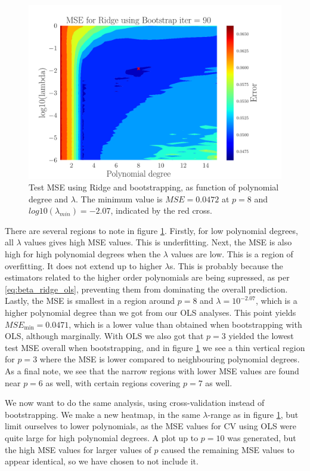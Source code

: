 \documentclass[reprint,english,notitlepage,aps,nobalancelastpage,nofootinbib]{revtex4-1}  %
\begin{document}
\begin{figure}[h]
	\begin{center}
		\includegraphics[width=0.8\linewidth]{Contour_PL_Ridge_Bootstrap90_n30_eps0.2_p1_15_lmb0_m6.pdf}
	\end{center}
	\caption{Test MSE using Ridge and bootstrapping, as function of polynomial degree and $\lambda$. The minimum value is $MSE=0.0472$ at $p=8$ and $log10(\lambda_{min}) = -2.07$, indicated by the red cross.}
	\label{fig:Ridge-boot_heatmap}
\end{figure}

There are several regions to note in figure \ref{fig:Ridge-boot_heatmap}. Firstly, for low polynomial degrees, all $\lambda$ values gives high MSE values. This is underfitting. Next, the MSE is also high for high polynomial degrees when the $\lambda$ values are low. This is a region of overfitting. It does not extend up to higher $\lambda$s. This is probably because the estimators related to the higher order polynomials are being supressed, as per \eqref{eq:beta_ridge_ols}, preventing them from dominating the overall prediction. Lastly, the MSE is smallest in a region around $p=8$ and $\lambda=10^{-2.07}$, which is a higher polynomial degree than we got from our OLS analyses. This point yields $MSE_\text{min}=0.0471$, which is a lower value than obtained when bootstrapping with OLS, although marginally. With OLS we also got that $p=3$ yielded the lowest test MSE overall when bootstrapping, and in figure \ref{fig:Ridge-boot_heatmap} we see a thin vertical region for $p=3$ where the MSE is lower compared to neighbouring polynomial degrees. As a final note, we see that the narrow regions with lower MSE values are found near $p=6$ as well, with certain regions covering $p=7$ as well.

We now want to do the same analysis, using cross-validation instead of bootstrapping. We make a new heatmap, in the same $\lambda$-range as in figure \ref{fig:Ridge-boot_heatmap}, but limit ourselves to lower polynomials, as the MSE values for CV using OLS were quite large for high polynomial degrees. A plot up to $p=10$ was generated, but the high MSE values for larger values of $p$ caused the remaining MSE values to appear identical, so we have chosen to not include it.
\end{document}

